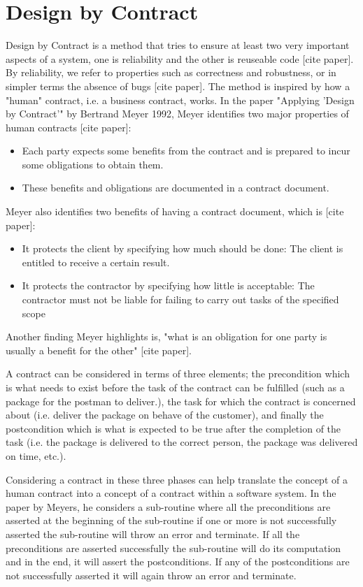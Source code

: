 \section{Design by Contract}\label{sec:DbC}

Design by Contract is a method that tries to ensure at least two very important aspects of a system, one is reliability and the other is reuseable code [cite paper].
By reliability, we refer to properties such as correctness and robustness, or in simpler terms the absence of bugs [cite paper].
The method is inspired by how a "human" contract, i.e. a business contract, works.
In the paper "Applying 'Design by Contract'" by Bertrand Meyer 1992, Meyer identifies two major properties of human contracts [cite paper]:
\begin{itemize}
    \item Each party expects some benefits from the contract and is prepared to incur some obligations to obtain them.
    \item These benefits and obligations are documented in a contract document.
\end{itemize}

Meyer also identifies two benefits of having a contract document, which is [cite paper]:
\begin{itemize}
    \item It protects the client by specifying how much should be done: The client is entitled to receive a certain result.
    \item It protects the contractor by specifying how little is acceptable: The contractor must not be liable for failing to carry out tasks of the specified scope
\end{itemize}

Another finding Meyer highlights is, "what is an obligation for one party is usually a benefit for the other" [cite paper].

A contract can be considered in terms of three elements; the precondition which is what needs to exist before the task of the contract can be fulfilled (such as a package for the postman to deliver.), the task for which the contract is concerned about (i.e. deliver the package on behave of the customer), and finally the postcondition which is what is expected to be true after the completion of the task (i.e. the package is delivered to the correct person, the package was delivered on time, etc.).

Considering a contract in these three phases can help translate the concept of a human contract into a concept of a contract within a software system. In the paper by Meyers, he considers a sub-routine where all the preconditions are asserted at the beginning of the sub-routine if one or more is not successfully asserted the sub-routine will throw an error and terminate. If all the preconditions are asserted successfully the sub-routine will do its computation and in the end, it will assert the postconditions. If any of the postconditions are not successfully asserted it will again throw an error and terminate.

